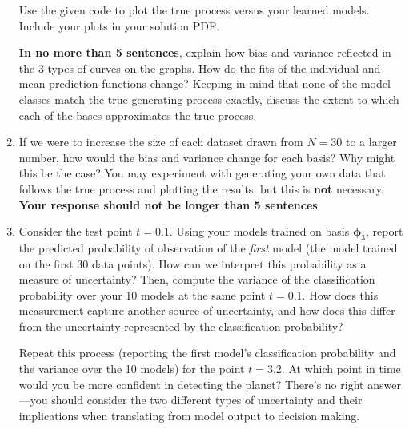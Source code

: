 \documentclass[submit]{harvardml}
\begin{document}
\begin{problem}
\begin{enumerate}
Use the given code to plot the true process versus your learned models. Include your plots in your solution PDF.

\textbf{In no more than 5 sentences}, explain how bias and variance reflected in the 3 types of curves on the graphs.  How do the fits of the individual and mean prediction functions change?  Keeping in mind that none of the model classes match the true generating process exactly, discuss the extent to which each of the bases approximates the true process.

\item If we were to increase the size of each dataset drawn from $N = 30$ to a larger number, how would the bias and variance change for each basis? Why might this be the case? You may experiment with generating your own data that follows the true process and plotting the results, but this is \textbf{not} necessary. \textbf{Your response should not be longer than 5 sentences}.

\item Consider the test point $t = 0.1$. Using your models trained on basis $\boldsymbol\phi_3$, report the predicted probability of observation of the \textit{first} model (the model trained on the first 30 data points). How can we interpret this probability as a measure of uncertainty? Then, compute the variance of the classification probability over your 10 models at the same point $t = 0.1$. How does this measurement capture another source of uncertainty, and how does this differ from the uncertainty represented by the classification probability?

Repeat this process (reporting the first model's classification probability and the variance over the 10 models) for the point $t = 3.2$. At which point in time would you be more confident in detecting the planet? There's no right answer---you should consider the two different types of uncertainty and their implications when translating from model output to decision making.

\end{enumerate}
\end{problem}
 \let\cleardoublepage\clearpage


\end{document}
